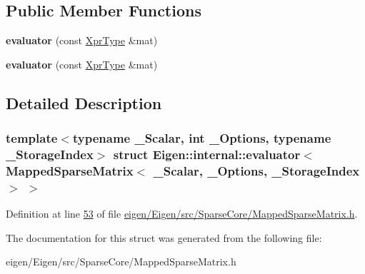 \subsection*{Public Member Functions}
\begin{DoxyCompactItemize}
\item 
\mbox{\label{struct_eigen_1_1internal_1_1evaluator_3_01_mapped_sparse_matrix_3_01___scalar_00_01___options_00_01___storage_index_01_4_01_4_a2c3f5654d832a7550a8e8cfc07d671f8}} 
{\bfseries evaluator} (const \hyperlink{class_eigen_1_1_mapped_sparse_matrix}{Xpr\+Type} \&mat)
\item 
\mbox{\label{struct_eigen_1_1internal_1_1evaluator_3_01_mapped_sparse_matrix_3_01___scalar_00_01___options_00_01___storage_index_01_4_01_4_a2c3f5654d832a7550a8e8cfc07d671f8}} 
{\bfseries evaluator} (const \hyperlink{class_eigen_1_1_mapped_sparse_matrix}{Xpr\+Type} \&mat)
\end{DoxyCompactItemize}


\subsection{Detailed Description}
\subsubsection*{template$<$typename \+\_\+\+Scalar, int \+\_\+\+Options, typename \+\_\+\+Storage\+Index$>$\newline
struct Eigen\+::internal\+::evaluator$<$ Mapped\+Sparse\+Matrix$<$ \+\_\+\+Scalar, \+\_\+\+Options, \+\_\+\+Storage\+Index $>$ $>$}



Definition at line \hyperlink{eigen_2_eigen_2src_2_sparse_core_2_mapped_sparse_matrix_8h_source_l00053}{53} of file \hyperlink{eigen_2_eigen_2src_2_sparse_core_2_mapped_sparse_matrix_8h_source}{eigen/\+Eigen/src/\+Sparse\+Core/\+Mapped\+Sparse\+Matrix.\+h}.



The documentation for this struct was generated from the following file\+:\begin{DoxyCompactItemize}
\item 
eigen/\+Eigen/src/\+Sparse\+Core/\+Mapped\+Sparse\+Matrix.\+h\end{DoxyCompactItemize}
